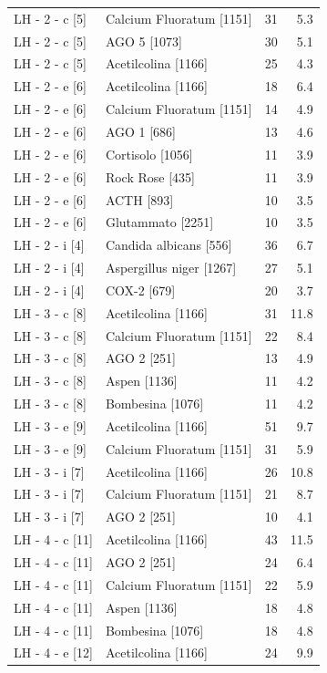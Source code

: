 \documentclass[a4paper,11pt]{article}
\begin{document}
\begin{footnotesize}
\begin{longtable}{p{3.5cm}p{7.5cm}rr}
LH - 2 - c [5] & Calcium Fluoratum [1151] & 31 & 5.3 \\
LH - 2 - c [5] & AGO 5 [1073] & 30 & 5.1 \\
LH - 2 - c [5] & Acetilcolina [1166] & 25 & 4.3 \\
LH - 2 - e [6] & Acetilcolina [1166] & 18 & 6.4 \\
LH - 2 - e [6] & Calcium Fluoratum [1151] & 14 & 4.9 \\
LH - 2 - e [6] & AGO 1 [686] & 13 & 4.6 \\
LH - 2 - e [6] & Cortisolo [1056] & 11 & 3.9 \\
LH - 2 - e [6] & Rock Rose [435] & 11 & 3.9 \\
LH - 2 - e [6] & ACTH [893] & 10 & 3.5 \\
LH - 2 - e [6] & Glutammato [2251] & 10 & 3.5 \\
LH - 2 - i [4] & Candida albicans [556] & 36 & 6.7 \\
LH - 2 - i [4] & Aspergillus niger [1267] & 27 & 5.1 \\
LH - 2 - i [4] & COX-2 [679] & 20 & 3.7 \\
LH - 3 - c [8] & Acetilcolina [1166] & 31 & 11.8 \\
LH - 3 - c [8] & Calcium Fluoratum [1151] & 22 & 8.4 \\
LH - 3 - c [8] & AGO 2 [251] & 13 & 4.9 \\
LH - 3 - c [8] & Aspen [1136] & 11 & 4.2 \\
LH - 3 - c [8] & Bombesina [1076] & 11 & 4.2 \\
LH - 3 - e [9] & Acetilcolina [1166] & 51 & 9.7 \\
LH - 3 - e [9] & Calcium Fluoratum [1151] & 31 & 5.9 \\
LH - 3 - i [7] & Acetilcolina [1166] & 26 & 10.8 \\
LH - 3 - i [7] & Calcium Fluoratum [1151] & 21 & 8.7 \\
LH - 3 - i [7] & AGO 2 [251] & 10 & 4.1 \\
LH - 4 - c [11] & Acetilcolina [1166] & 43 & 11.5 \\
LH - 4 - c [11] & AGO 2 [251] & 24 & 6.4 \\
LH - 4 - c [11] & Calcium Fluoratum [1151] & 22 & 5.9 \\
LH - 4 - c [11] & Aspen [1136] & 18 & 4.8 \\
LH - 4 - c [11] & Bombesina [1076] & 18 & 4.8 \\
LH - 4 - e [12] & Acetilcolina [1166] & 24 & 9.9 \\

\end{longtable}
\end{footnotesize}
\end{document}
